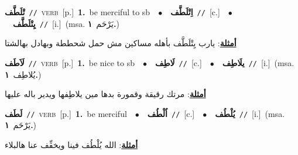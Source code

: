 \documentclass[10pt,a4paper,twoside]{article} %
\begin{document}
\begin{multicols}{2}
{\setlength\topsep{0pt}\textbf{\foreignlanguage{arabic}{تْلَطَّف}}\ {\color{gray}\texttt{//}\color{black}}\ \textsc{verb}\ [p.]\ \textbf{1.}~be merciful to sb\ \ $\bullet$\ \ \setlength\topsep{0pt}\textbf{\foreignlanguage{arabic}{اِتْلَطَّف}}\ {\color{gray}\texttt{//}\color{black}}\ [c.]\ \ $\bullet$\ \ \setlength\topsep{0pt}\textbf{\foreignlanguage{arabic}{يِتْلَطَّف}}\ {\color{gray}\texttt{//}\color{black}}\ [i.]\ \color{gray}(msa. \foreignlanguage{arabic}{يَرْحَم}~\foreignlanguage{arabic}{\textbf{١.}})\color{black}\  \begin{flushright}\color{gray}\foreignlanguage{arabic}{\textbf{\underline{\foreignlanguage{arabic}{أمثلة}}}: يارب يِتْلَطَّف بأهله مساكين مش حمل شحططة وبهادل بهالشتا}\end{flushright}\color{black}} \vspace{2mm}

{\setlength\topsep{0pt}\textbf{\foreignlanguage{arabic}{لَاَطَف}}\ {\color{gray}\texttt{//}\color{black}}\ \textsc{verb}\ [p.]\ \textbf{1.}~be nice to sb\ \ $\bullet$\ \ \setlength\topsep{0pt}\textbf{\foreignlanguage{arabic}{لَاطِف}}\ {\color{gray}\texttt{//}\color{black}}\ [c.]\ \ $\bullet$\ \ \setlength\topsep{0pt}\textbf{\foreignlanguage{arabic}{يلَاطِف}}\ {\color{gray}\texttt{//}\color{black}}\ [i.]\ \color{gray}(msa. \foreignlanguage{arabic}{يُلاطِف}~\foreignlanguage{arabic}{\textbf{١.}})\color{black}\  \begin{flushright}\color{gray}\foreignlanguage{arabic}{\textbf{\underline{\foreignlanguage{arabic}{أمثلة}}}: مرتك رقيقة وقمورة بدها مين يلاطِفها ويدير باله عليها}\end{flushright}\color{black}} \vspace{2mm}

{\setlength\topsep{0pt}\textbf{\foreignlanguage{arabic}{لَطَف}}\ {\color{gray}\texttt{//}\color{black}}\ \textsc{verb}\ [p.]\ \textbf{1.}~be merciful\ \ $\bullet$\ \ \setlength\topsep{0pt}\textbf{\foreignlanguage{arabic}{اُلْطُف}}\ {\color{gray}\texttt{//}\color{black}}\ [c.]\ \ $\bullet$\ \ \setlength\topsep{0pt}\textbf{\foreignlanguage{arabic}{يُلْطُف}}\ {\color{gray}\texttt{//}\color{black}}\ [i.]\ \color{gray}(msa. \foreignlanguage{arabic}{يَرْحَم}~\foreignlanguage{arabic}{\textbf{١.}})\color{black}\  \begin{flushright}\color{gray}\foreignlanguage{arabic}{\textbf{\underline{\foreignlanguage{arabic}{أمثلة}}}: الله يُلْطُف فينا ويخفِّف عنا هالبلاء}\end{flushright}\color{black}} \vspace{2mm}


\end{multicols}
\end{document}
